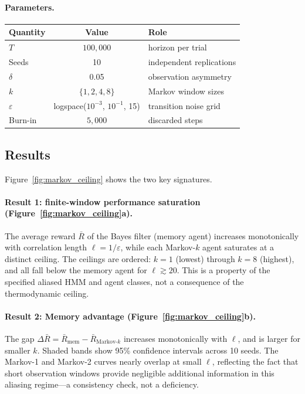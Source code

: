 \documentclass[12pt]{article}
\begin{document}
\paragraph{Parameters.}
\begin{center}
\small
\begin{tabular}{@{}lcl@{}}
\toprule
\textbf{Quantity} & \textbf{Value} & \textbf{Role} \\
\midrule
$T$ & $100{,}000$ & horizon per trial \\
Seeds & 10 & independent replications \\
$\delta$ & 0.05 & observation asymmetry \\
$k$ & $\{1, 2, 4, 8\}$ & Markov window sizes \\
$\varepsilon$ & logspace($10^{-3}$, $10^{-1}$, 15)
  & transition noise grid \\
Burn-in & $5{,}000$ & discarded steps \\
\bottomrule
\end{tabular}
\end{center}

\subsection{Results}
\label{subsec:demo_results}

Figure~\ref{fig:markov_ceiling} shows the two key signatures.

\paragraph{Result 1: finite-window performance saturation
(Figure~\ref{fig:markov_ceiling}a).}
The average reward $\bar{R}$ of the Bayes filter (memory
agent) increases monotonically with correlation length
$\ell = 1/\varepsilon$, while each Markov-$k$ agent
saturates at a distinct ceiling.  The ceilings are
ordered: $k = 1$ (lowest) through $k = 8$ (highest),
and all fall below the memory agent for
$\ell \gtrsim 20$.  This is a property of the specified
aliased HMM and agent classes, not a consequence of the
thermodynamic ceiling.

\paragraph{Result 2: Memory advantage
(Figure~\ref{fig:markov_ceiling}b).}
The gap $\Delta\bar{R} = \bar{R}_{\mathrm{mem}}
- \bar{R}_{\mathrm{Markov}\text{-}k}$ increases
monotonically with $\ell$, and is larger for smaller $k$.
Shaded bands show 95\% confidence intervals across
10 seeds.  The Markov-1 and Markov-2 curves nearly
overlap at small $\ell$, reflecting the fact that
short observation windows provide negligible additional
information in this aliasing regime---a consistency
check, not a deficiency.
\end{document}
